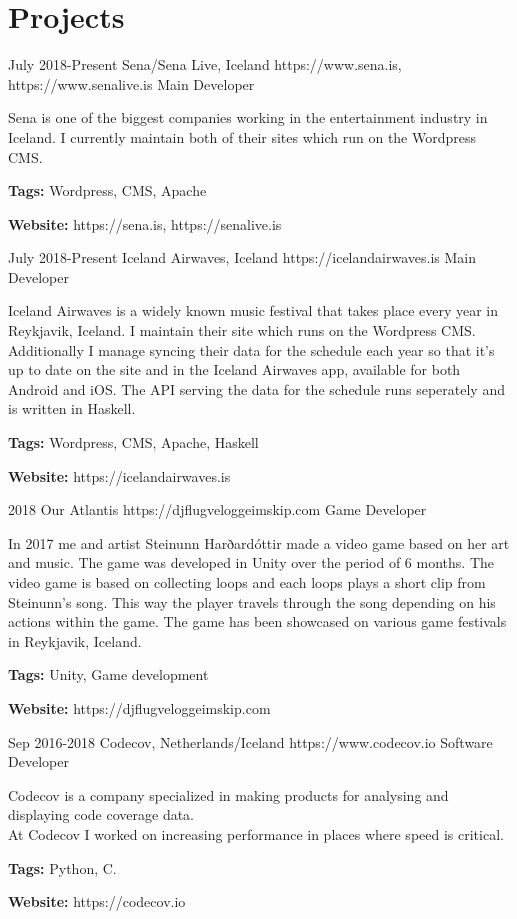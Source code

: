 \documentclass[10pt]{article} %
\begin{document}
\section{Projects}

\job
{July 2018-}{Present}
{Sena/Sena Live, Iceland}
{https://www.sena.is, https://www.senalive.is}
{Main Developer}
{Sena is one of the biggest companies working in the entertainment industry in Iceland. I currently maintain both of their sites which run on the Wordpress CMS.\\
\rule{0mm}{5mm}\textbf{Tags:} Wordpress, CMS, Apache\\
\rule{0mm}{5mm}\textbf{Website: }https://sena.is, https://senalive.is}

\job
{July 2018-}{Present}
{Iceland Airwaves, Iceland}
{https://icelandairwaves.is}
{Main Developer}
{Iceland Airwaves is a widely known music festival that takes place every year in Reykjavik, Iceland. I maintain their site which runs on the Wordpress CMS. Additionally I manage syncing their data for the schedule each year so that it's up to date on the site and in the Iceland Airwaves app, available for both Android and iOS. The API serving the data for the schedule runs seperately and is written in Haskell.\\
\rule{0mm}{5mm}\textbf{Tags:} Wordpress, CMS, Apache, Haskell\\
\rule{0mm}{5mm}\textbf{Website:} https://icelandairwaves.is
}

\job
{2018}{}
{Our Atlantis}
{https://djflugveloggeimskip.com}
{Game Developer}
{In 2017 me and artist Steinunn Harðardóttir made a video game based on her art and music. The game was developed in Unity over the period of 6 months. The video game is based on collecting loops and each loops plays a short clip from Steinunn's song. This way the player travels through the song depending on his actions within the game. The game has been showcased on various game festivals in Reykjavik, Iceland.\\
\rule{0mm}{5mm}\textbf{Tags:} Unity, Game development\\
\rule{0mm}{5mm}\textbf{Website:} https://djflugveloggeimskip.com
}

\newpage

\job
{Sep 2016-}{2018}
{Codecov, Netherlands/Iceland}
{https://www.codecov.io}
{Software Developer}
{Codecov is a company specialized in making products for analysing and displaying code coverage data.\\
At Codecov I worked on increasing performance in places where speed is critical.\\
\rule{0mm}{5mm}\textbf{Tags:} Python, C.\\
\rule{0mm}{5mm}\textbf{Website:} https://codecov.io 
}
\end{document}
